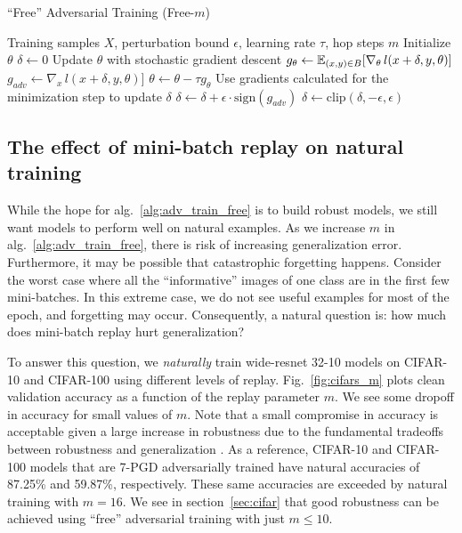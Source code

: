 \documentclass{article}
\begin{document}
\begin{algorithm}[t]
	\caption{
		``Free'' Adversarial Training (Free-$m$)
	}
	\label{alg:adv_train_free}
	\begin{algorithmic}[1]
		\Require Training samples $X$, perturbation bound $\epsilon$, learning rate $\tau$, hop steps $m$
		\State Initialize $\theta$
		\State $\delta \gets 0$
		\State Update $\theta$ with stochastic gradient descent
		\State \qquad  $g_\theta \gets  \mathbb{E}_{(x,y) \in B} [\nabla_\theta \, l(x+\delta, y, \theta)]$
		\State \qquad  $g_{adv} \gets  \nabla_{x} \, l(x+\delta, y, \theta)]$
		\State \qquad  $\theta \gets \theta - \tau g_\theta$
		\State Use gradients calculated for the minimization step to update $\delta$
		\State \qquad $\delta \gets \delta + \epsilon\cdot\text{sign}(g_{adv})$
		\State \qquad $\delta \gets \text{clip}(\delta, -\epsilon, \epsilon) $
		\EndFor
		\EndFor
		\EndFor
	\end{algorithmic}
\end{algorithm}

\subsection*{The effect of mini-batch replay on natural training}\label{sec:increase_m}

While the hope for alg.~\ref{alg:adv_train_free} is to build robust models, we still want models to perform well on natural examples. As we increase $m$ in alg.~\ref{alg:adv_train_free}, there is risk of increasing generalization error. 
Furthermore, it may be possible that catastrophic forgetting happens. Consider the worst case where all the ``informative'' images of one class are in the first few mini-batches. In this extreme case, we do not see useful examples for most of the epoch, and forgetting may occur. Consequently, a natural question is: how much does mini-batch replay hurt generalization? 

To answer this question, we {\em naturally} train wide-resnet 32-10 models on CIFAR-10 and CIFAR-100 using different levels of replay.  Fig.~\ref{fig:cifars_m} plots clean validation accuracy as a function of the replay parameter $m$.
We see some dropoff in accuracy for small values of $m.$ Note that a small compromise in accuracy is acceptable given a large increase in robustness due to the fundamental tradeoffs between robustness and generalization \citep{tsipras2018robustness,zhang2019theoretically,shafahi2018adversarial}.  As a reference, CIFAR-10 and CIFAR-100 models that are 7-PGD adversarially trained have natural accuracies of 87.25\% and 59.87\%, respectively. These same accuracies are exceeded by natural training with $m=16.$  We see in section~\ref{sec:cifar} that good robustness can be achieved using ``free'' adversarial training with just $m\le 10.$
\end{document}
